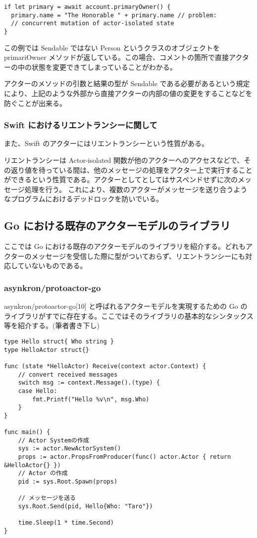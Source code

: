 \begin{verbatim}
if let primary = await account.primaryOwner() {
  primary.name = "The Honorable " + primary.name // problem:
  // concurrent mutation of actor-isolated state
}
\end{verbatim}

この例では Sendable ではない Person というクラスのオブジェクトを
primariOwner
メソッドが返している。この場合、コメントの箇所で直接アクターの中の状態を変更できてしまっていることがわかる。

アクターのメソッドの引数と結果の型が Sendable
である必要があるという規定により、上記のような外部から直接アクターの内部の値の変更をすることなどを防ぐことが出来る。

\subsubsection{Swift におけるリエントランシーに関して}

また、Swift のアクターにはリエントランシーという性質がある。

リエントランシーは Actor-isolated
関数が他のアクターへのアクセスなどで、その返り値を待っている間は、他のメッセージの処理をアクター上で実行することができるという性質である。アクターとしてとしてはサスペンドせずに次のメッセージ処理を行う。
これにより、複数のアクターがメッセージを送り合うようなプログラムにおけるデッドロックを防いでいる。

\subsection{Go における既存のアクターモデルのライブラリ}

ここでは Go
における既存のアクターモデルのライブラリを紹介する。どれもアクターのメッセージを受信した際に型がついておらず、リエントランシーにも対応していないものである。

\subsubsection{asynkron/protoactor-go}

asynkron/protoactor-go{[}10{]} と呼ばれるアクターモデルを実現するための
Go
のライブラリがすでに存在する。ここではそのライブラリの基本的なシンタックス等を紹介する。(筆者書き下し)

\begin{verbatim}
type Hello struct{ Who string }
type HelloActor struct{}

func (state *HelloActor) Receive(context actor.Context) {
    // convert received messages
    switch msg := context.Message().(type) {
    case Hello:
        fmt.Printf("Hello %v\n", msg.Who)
    }
}

func main() {
    // Actor Systemの作成
    sys := actor.NewActorSystem()
    props := actor.PropsFromProducer(func() actor.Actor { return &HelloActor{} })
    // Actor の作成
    pid := sys.Root.Spawn(props)

    // メッセージを送る
    sys.Root.Send(pid, Hello{Who: "Taro"})

    time.Sleep(1 * time.Second)
}
\end{verbatim}

